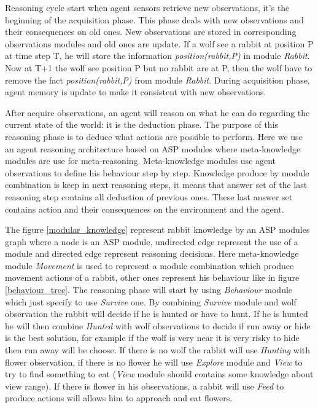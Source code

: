 \documentclass{aamas2012}
\begin{document}
	Reasoning cycle start when agent sensors retrieve new observations, it's the beginning of the acquisition phase.
	This phase deals with new observations and their consequences on old ones.
	New observations are stored in corresponding observations modules and old ones are update.
	If a wolf see a rabbit at position P at time step T, he will store the information \textit{position(rabbit,P)} in module \textit{Rabbit}.
	Now at T+1 the wolf see position P but no rabbit are at P, then the wolf have to remove the fact \textit{position(rabbit,P)} from module \textit{Rabbit}.
	During acquisition phase, agent memory is update to make it consistent with new observations.
	
	After acquire observations, an agent will reason on what he can do regarding the current state of the world: it is the deduction phase.
	The purpose of this reasoning phase is to deduce what actions are possible to perform.
	Here we use an agent reasoning architecture based on ASP modules where meta-knowledge modules are use for meta-reasoning.
	Meta-knowledge modules use agent observations to define his behaviour step by step.
	Knowledge produce by module combination is keep in next reasoning steps, 
	it means that answer set of the last reasoning step contains all deduction of previous ones.
	These last answer set contains action and their consequences on the environment and the agent.
	
	The figure \ref{modular_knowledge} represent rabbit knowledge by an ASP modules graph where a node is an ASP module, 
	undirected edge represent the use of a module and directed edge represent reasoning decisions.
	Here meta-knowledge module \textit{Movement} is used to represent a module combination which produce movement actions of a rabbit,
	other ones represent his behaviour like in figure \ref{behaviour_tree}.
	The reasoning phase will start by using \textit{Behaviour} module which just specify to use \textit{Survive} one.
	By combining \textit{Survive} module and wolf observation the rabbit will decide if he is hunted or have to hunt.
	If he is hunted he will then combine \textit{Hunted} with wolf observations to decide if run away or hide is the best solution,
	for example if the wolf is very near it is very risky to hide then run away will be choose.
	If there is no wolf the rabbit will use \textit{Hunting} with flower observation, if there is no flower he will use \textit{Explore} module
	and \textit{View} to try to find something to eat (\textit{View} module should contains some knowledge about view range).
	If there is flower in his observations, a rabbit will use \textit{Feed} to produce actions will allows him to approach and eat flowers.
	
\end{document}
